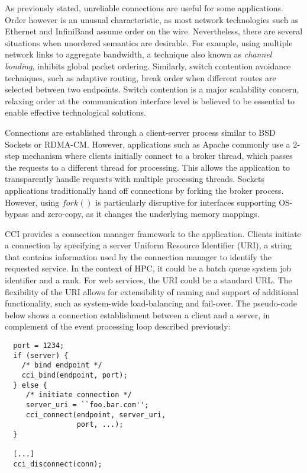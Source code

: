As previously stated, unreliable connections are useful for some applications. 
Order however is an unusual characteristic, as most network technologies such 
as Ethernet and InfiniBand assume order on the wire. 
Nevertheless, there are several situations when unordered semantics are 
desirable. For example, using multiple network links to aggregate bandwidth, 
a technique also known as \emph{channel bonding}, inhibits global packet ordering. 
Similarly, switch contention avoidance techniques, 
such as adaptive routing, break order when different routes are selected 
between two endpoints. Switch contention is a major scalability concern, 
relaxing order at the communication interface level is believed to be 
essential to enable effective technological solutions.

Connections are established through a client-server process similar to 
BSD Sockets or RDMA-CM. However, applications such as 
Apache commonly use a 2-step mechanism where clients 
initially connect to a broker thread, which passes the requests to a 
different thread for processing. This allows the application to 
transparently handle requests with multiple processing threads. Sockets applications traditionally hand off connections by forking the broker process. However, using $fork()$ is particularly disruptive for interfaces supporting OS-bypass and zero-copy, as it changes the underlying memory mappings.

CCI provides a connection manager framework to 
the application. Clients initiate a connection by specifying a server 
Uniform Resource Identifier (URI), a string that contains information used 
by the connection manager to identify the requested service. In the context of 
HPC, it could be a batch queue system job identifier and a rank. For web 
services, the URI could be a standard URL. The flexibility of the URI allows 
for extensibility of naming and support of additional functionality, such as 
system-wide load-balancing and fail-over. The pseudo-code below shows a connection establishment between a client and a server, in complement of the event processing loop described previously:

\lstset{language=C, frame=single, basicstyle=\small}
\begin{lstlisting}
  port = 1234;
  if (server) {
    /* bind endpoint */
    cci_bind(endpoint, port);
  } else {
     /* initiate connection */
     server_uri = ``foo.bar.com'';
     cci_connect(endpoint, server_uri, 
                 port, ...);
  }

  [...]
  cci_disconnect(conn);
\end{lstlisting}


